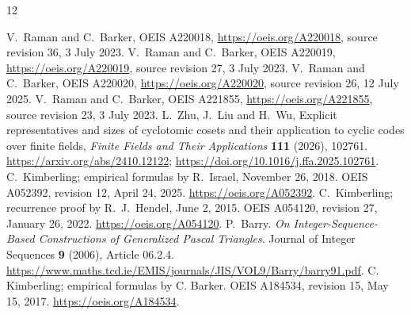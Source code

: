 \documentclass[11pt]{article}
\begin{document}
\begin{thebibliography}{12}
\raggedright
{} V.~Raman and C.~Barker, OEIS A220018, \url{https://oeis.org/A220018}, source revision 36, 3 July 2023.
 V.~Raman and C.~Barker, OEIS A220019, \url{https://oeis.org/A220019}, source revision 27, 3 July 2023.
 V.~Raman and C.~Barker, OEIS A220020, \url{https://oeis.org/A220020}, source revision 26, 12 July 2025.
 V.~Raman and C.~Barker, OEIS A221855, \url{https://oeis.org/A221855}, source revision 23, 3 July 2023.
 L.~Zhu, J.~Liu and H.~Wu, Explicit representatives and sizes of cyclotomic cosets and their application to cyclic codes over finite fields, \emph{Finite Fields and Their Applications} \textbf{111} (2026), 102761. \url{https://arxiv.org/abs/2410.12122}; \url{https://doi.org/10.1016/j.ffa.2025.102761}.
 C.~Kimberling; empirical formulas by R.~Israel, November 26, 2018.
OEIS A052392, revision 12, April 24, 2025. \url{https://oeis.org/A052392}.
 C.~Kimberling; recurrence proof by R.~J.~Hendel, June 2, 2015.
OEIS A054120, revision 27, January 26, 2022. \url{https://oeis.org/A054120}.
 P.~Barry. \emph{On Integer-Sequence-Based Constructions of Generalized Pascal Triangles}.
Journal of Integer Sequences \textbf{9} (2006), Article 06.2.4.
\url{https://www.maths.tcd.ie/EMIS/journals/JIS/VOL9/Barry/barry91.pdf}.
C. Kimberling; empirical formulas by C. Barker.
OEIS A184534, revision 15, May 15, 2017.
\url{https://oeis.org/A184534}.

\end{thebibliography}
\end{document}
